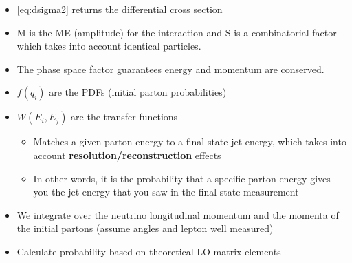 \begin{frame}[shrink=23]
\begin{block}{}
		\begin{itemize}
			\item \eqref{eq:dsigma2} returns the differential cross section
        			\item M is the ME (amplitude) for the interaction and S is a combinatorial factor which takes into account identical particles.
		        \item The phase space factor guarantees energy and momentum are conserved.
			\item $f(q_{i})$ are the PDFs (initial parton probabilities)
		        \item $W(E_{i},E_{j})$ are the transfer functions
		        \begin{itemize}
				\item Matches a given parton energy to a final state jet energy, which takes into account \textbf{resolution/reconstruction} effects
				\item In other words, it is the probability that a specific parton energy gives you the jet energy that you saw in the final state measurement
			\end{itemize}
			\item We integrate over the neutrino longitudinal momentum and the momenta of the initial partons (assume angles and lepton well measured)
			\item Calculate probability based on theoretical LO matrix elements
		\end{itemize}
	\end{block}
\end{frame}

